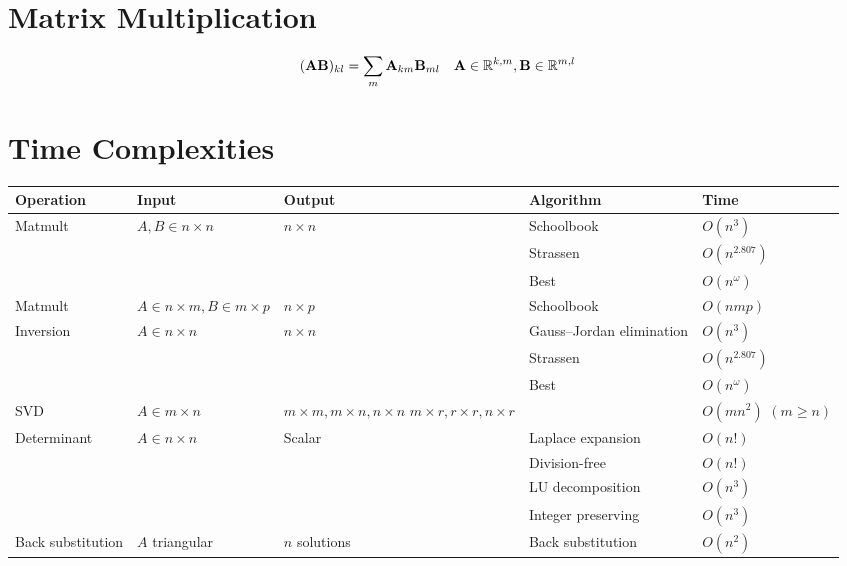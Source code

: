 \section{Matrix Multiplication}

\begin{equation}
(\mathbf{A}\mathbf{B})_{kl} = \sum_m \mathbf{A}_{km}\mathbf{B}_{ml}~~~\mathbf{A}\in\mathbb{R}^{k,m},\mathbf{B}\in\mathbb{R}^{m,l}
\end{equation}


\section{Time Complexities}
\begin{center}
{\footnotesize\renewcommand{\arraystretch}{1.2}
\begin{tabular}{p{1.5cm}p{3cm}p{3cm}p{4cm}p{1cm}}
\textbf{Operation}             & \textbf{Input}                   & \textbf{Output}    & \textbf{Algorithm}                     & \textbf{Time}   \\ \hline
Matmult
    & $A,B\in n\times n$
    & $n \times n$
    & Schoolbook
    & $O(n^3)$
    \\ \hline

    &
    &
    & Strassen~\citep{Strassen1969}
    & $O(n^{2.807})$
    \\ \hline

    &
    &
    & Best
    & $O(n^\omega)$
    \\ \hline
Matmult
    & $A\in n\times m, B\in m\times p$
    & $n \times p$
    & Schoolbook
    & $O(nmp)$
    \\ \hline
Inversion
    & $A\in n\times n$
    & $n \times n$
    & Gauss--Jordan elimination
    & $O(n^3)$
    \\ \hline

    &
    &
    & Strassen~\citep{Strassen1969}
    & $O(n^{2.807})$
    \\ \hline

    &
    &
    & Best
    & $O(n^\omega)$
    \\ \hline
SVD
    & $A\in m\times n$
    & $m\times m, m\times n, n\times n$ \newline $m\times r, r\times r, n\times r$
    &
    & $O(mn^2)$ \newline \hbox{$(m\ge n)$} \\ \hline
Determinant
    & $A\in n\times n$
    & Scalar
    & Laplace expansion
    & $O(n!)$         \\ \hline

    &
    &
    & Division-free~\citep{Rote2001}
    & $O(n!)$
    \\ \hline

    &
    &
    & LU decomposition
    & $O(n^3)$
    \\ \hline

    &
    &
    & Integer preserving~\citep{Bareiss1968}
    & $O(n^3)$
    \\ \hline
Back \newline substitution
    & $A$ triangular
    & $n$ solutions
    & Back substitution
    & $O(n^2)$
    \\ \hline
\end{tabular}
}
\end{center}

